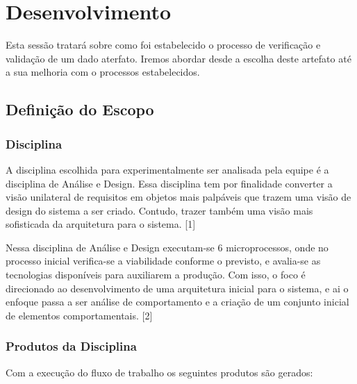 \chapter[Desenvolvimento ]{Desenvolvimento}
Esta sessão tratará sobre como foi estabelecido o processo de verificação e
validação de um dado aterfato. Iremos abordar desde a escolha deste artefato até
a sua melhoria com o processos estabelecidos.
\section{Definição do Escopo}
\subsection{Disciplina }

A disciplina escolhida para experimentalmente ser analisada pela equipe é a disciplina de Análise e Design. Essa disciplina tem por finalidade converter a visão unilateral de requisitos em objetos mais palpáveis que trazem uma visão de design do sistema a ser criado. Contudo, trazer também uma visão mais sofisticada da arquitetura para o sistema. [1] 

Nessa disciplina de Análise e Design executam-se 6 microprocessos, onde no processo inicial verifica-se a viabilidade conforme o previsto, e avalia-se as tecnologias disponíveis para auxiliarem a produção. Com isso, o foco é direcionado ao desenvolvimento de uma arquitetura inicial para o sistema, e ai o enfoque passa a ser análise de comportamento e a criação de um conjunto inicial de elementos comportamentais. [2]

\subsection{Produtos da Disciplina}
Com a execução do fluxo de trabalho os seguintes produtos são gerados: 

